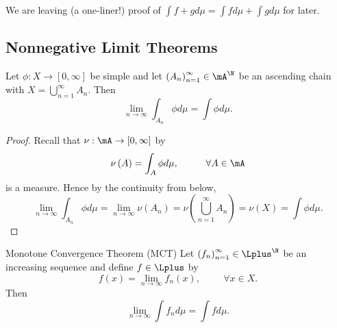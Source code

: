 \documentclass[pmath451]{subfiles}
\begin{document}
    \np We are leaving (a one-liner!) proof of $\int f+gd\mu = \int fd\mu + \int gd\mu$ for later.
    
    \subsection{Nonnegative Limit Theorems}
    
    \begin{lemma}{}
        Let $\phi:X\to\left[ 0,\infty \right]$ be simple and let $\left( A_{n} \right)^{\infty}_{n=1}\in\mA^{\N}$ be an ascending chain with $X = \bigcup^{\infty}_{n=1}A_n$. Then
        \begin{equation*}
            \lim_{n\to\infty}\int_{A_n} \phi d\mu = \int\phi d\mu.
        \end{equation*}
    \end{lemma}

    \begin{proof}
        Recall that $\nu:\mA\to\left[ 0,\infty \right]$ by
        \begin{equation*}
            \nu\left( A \right) = \int_A\phi d\mu, \hspace{1cm}\forall A\in\mA
        \end{equation*}
        is a measure. Hence by the continuity from below,
        \begin{equation*}
            \lim_{n\to\infty}\int_{A_n}\phi d\mu = \lim_{n\to\infty} \nu\left( A_n \right) = \nu\left( \bigcup^{\infty}_{n=1}A_n \right) = \nu\left( X \right) = \int\phi d\mu.
        \end{equation*}
    \end{proof}
    
    \begin{theorem}{Monotone Convergence Theorem (MCT)}
        Let $\left( f_{n} \right)^{\infty}_{n=1}\in\Lplus^{\N}$ be an increasing sequence and define $f\in\Lplus$ by
        \begin{equation*}
            f\left( x \right) = \lim_{n\to\infty} f_n\left( x \right),\hspace{1cm}\forall x\in X.
        \end{equation*}
        Then
        \begin{equation*}
            \lim_{n\to\infty}\int f_nd\mu = \int fd\mu.
        \end{equation*}
    \end{theorem}
        
\end{document}
